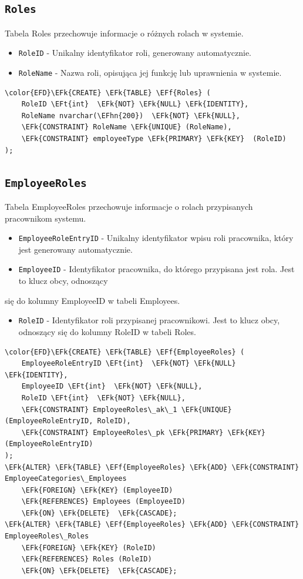 \documentclass[11pt]{article}
\newcommand{\EFk}[1]{\textcolor{EFk}{\textbf{#1}}} %
\newcommand{\EFf}[1]{\textcolor{EFf}{#1}} %
\newcommand{\EFt}[1]{\textcolor{EFt}{\textbf{#1}}} %
\newcommand{\EFhn}[1]{\textcolor{EFhn}{#1}} %
\begin{document}
\subsection{\texttt{Roles}}
\label{sec:org0b49b84}
Tabela Roles przechowuje informacje o różnych rolach w systemie.
\begin{itemize}
\item \texttt{RoleID} - Unikalny identyfikator roli, generowany automatycznie.
\item \texttt{RoleName} - Nazwa roli, opisująca jej funkcję lub uprawnienia w systemie.
\end{itemize}
\begin{Code}
\begin{Verbatim}
\color{EFD}\EFk{CREATE} \EFk{TABLE} \EFf{Roles} (
    RoleID \EFt{int}  \EFk{NOT} \EFk{NULL} \EFk{IDENTITY},
    RoleName nvarchar(\EFhn{200})  \EFk{NOT} \EFk{NULL},
    \EFk{CONSTRAINT} RoleName \EFk{UNIQUE} (RoleName),
    \EFk{CONSTRAINT} employeeType \EFk{PRIMARY} \EFk{KEY}  (RoleID)
);
\end{Verbatim}
\end{Code}
\subsection{\texttt{EmployeeRoles}}
\label{sec:org3869524}
Tabela EmployeeRoles przechowuje informacje o rolach przypisanych pracownikom systemu.
\begin{itemize}
\item \texttt{EmployeeRoleEntryID} - Unikalny identyfikator wpisu roli pracownika, który jest generowany automatycznie.
\item \texttt{EmployeeID} - Identyfikator pracownika, do którego przypisana jest rola. Jest to klucz obcy, odnoszący
\end{itemize}
się do kolumny EmployeeID w tabeli Employees.
\begin{itemize}
\item \texttt{RoleID} - Identyfikator roli przypisanej pracownikowi. Jest to klucz obcy, odnoszący się do kolumny RoleID w tabeli Roles.
\end{itemize}

\begin{Code}
\begin{Verbatim}
\color{EFD}\EFk{CREATE} \EFk{TABLE} \EFf{EmployeeRoles} (
    EmployeeRoleEntryID \EFt{int}  \EFk{NOT} \EFk{NULL} \EFk{IDENTITY},
    EmployeeID \EFt{int}  \EFk{NOT} \EFk{NULL},
    RoleID \EFt{int}  \EFk{NOT} \EFk{NULL},
    \EFk{CONSTRAINT} EmployeeRoles\_ak\_1 \EFk{UNIQUE} (EmployeeRoleEntryID, RoleID),
    \EFk{CONSTRAINT} EmployeeRoles\_pk \EFk{PRIMARY} \EFk{KEY}  (EmployeeRoleEntryID)
);
\EFk{ALTER} \EFk{TABLE} \EFf{EmployeeRoles} \EFk{ADD} \EFk{CONSTRAINT} EmployeeCategories\_Employees
    \EFk{FOREIGN} \EFk{KEY} (EmployeeID)
    \EFk{REFERENCES} Employees (EmployeeID)
    \EFk{ON} \EFk{DELETE}  \EFk{CASCADE};
\EFk{ALTER} \EFk{TABLE} \EFf{EmployeeRoles} \EFk{ADD} \EFk{CONSTRAINT} EmployeeRoles\_Roles
    \EFk{FOREIGN} \EFk{KEY} (RoleID)
    \EFk{REFERENCES} Roles (RoleID)
    \EFk{ON} \EFk{DELETE}  \EFk{CASCADE};
\end{Verbatim}
\end{Code}
\end{document}
